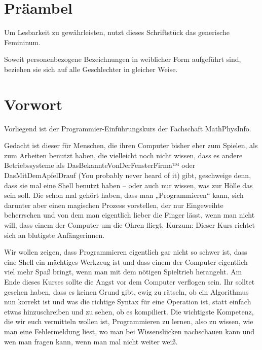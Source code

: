 \documentclass{vorkurs}
\begin{document}



\chapter*{Präambel}
\thispagestyle{empty}
Um Lesbarkeit zu gewährleisten, nutzt dieses Schriftstück das generische
Femininum.

Soweit personenbezogene Bezeichnungen in weiblicher Form aufgeführt sind,
beziehen sie sich auf alle Geschlechter in gleicher Weise.

\clearpage

\chapter*{Vorwort}
\thispagestyle{empty}
\pagestyle{empty}

Vorliegend ist der Programmier-Einführungskurs der Fachschaft MathPhysInfo.

Gedacht ist dieser für Menschen, die ihren Computer bisher eher zum Spielen,
als zum Arbeiten benutzt haben, die vielleicht noch nicht wissen, dass es
andere Betriebssysteme als DasBekannteVonDerFensterFirma™ oder
DasMitDemApfelDrauf (You probably never heard of it) gibt, geschweige denn,
dass sie mal eine Shell benutzt haben -- oder auch nur wissen, was zur Hölle das
sein soll.  Die schon mal gehört haben, dass man „Programmieren“ kann, sich
darunter aber einen magischen Prozess vorstellen, der nur Eingeweihte
beherrschen und von dem man eigentlich lieber die Finger lässt, wenn man nicht
will, dass einem der Computer um die Ohren fliegt.  Kurzum: Dieser Kurs richtet
sich an blutigste Anfängerinnen.

Wir wollen zeigen, dass Programmieren eigentlich gar nicht so schwer ist, dass
eine Shell ein mächtiges Werkzeug ist und dass einem der Computer eigentlich
viel mehr Spaß bringt, wenn man mit dem nötigen Spieltrieb herangeht.  Am Ende
dieses Kurses sollte die Angst vor dem Computer verflogen sein. Ihr solltet
gesehen haben, dass es keinen Grund gibt, ewig zu rätseln, ob ein Algorithmus
nun korrekt ist und was die richtige Syntax für eine Operation ist, statt
einfach etwas hinzuschreiben und zu sehen, ob es kompiliert.  Die wichtigste
Kompetenz, die wir euch vermitteln wollen ist, Programmieren zu lernen, also zu
wissen, wie man eine Fehlermeldung liest, wo man bei Wissenslücken nachschauen
kann und wen man fragen kann, wenn man mal nicht weiter weiß.
\end{document}

